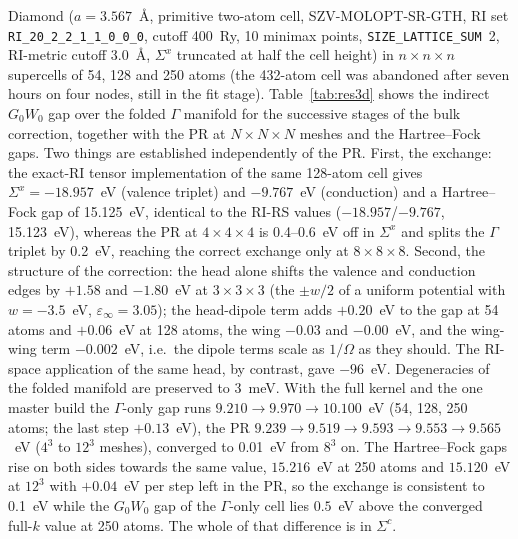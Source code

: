 \documentclass[%
 reprint,
superscriptaddress,
 amsmath,amssymb,
 aps,
prb,
]{revtex4-2}
\begin{document}
Diamond ($a=3.567$~\AA, primitive two-atom cell, SZV-MOLOPT-SR-GTH, RI set
\texttt{RI\_20\_2\_2\_1\_1\_0\_0\_0}, cutoff 400~Ry, 10 minimax points,
\texttt{SIZE\_LATTICE\_SUM}~2, RI-metric cutoff 3.0~\AA, $\Sigma^x$ truncated at half the
cell height) in $n\times n\times n$ supercells of 54, 128 and 250 atoms (the 432-atom cell was
abandoned after seven hours on four nodes, still in the fit stage). Table~\ref{tab:res3d} shows the
indirect $G_0W_0$ gap over the folded $\Gamma$ manifold for the successive stages of the
bulk correction, together with the PR at $N\times N\times N$ meshes and the Hartree--Fock
gaps. Two things are established independently of the PR. First, the exchange: the exact-RI
tensor implementation of the same 128-atom cell gives $\Sigma^x=-18.957$~eV (valence triplet)
and $-9.767$~eV (conduction) and a Hartree--Fock gap of 15.125~eV, identical to the RI-RS
values ($-18.957$/$-9.767$, 15.123~eV), whereas the PR at $4\times4\times4$ is 0.4--0.6~eV off
in $\Sigma^x$ and splits the $\Gamma$ triplet by 0.2~eV, reaching the correct exchange only at
$8\times8\times8$. Second, the structure of the correction: the head alone shifts the valence
and conduction edges by $+1.58$ and $-1.80$~eV at $3\times3\times3$ (the $\pm w/2$ of a uniform
potential with $w=-3.5$~eV, $\varepsilon_\infty=3.05$); the head-dipole term adds $+0.20$~eV
to the gap at 54 atoms and $+0.06$~eV at 128 atoms, the wing $-0.03$ and $-0.00$~eV, and the
wing-wing term $-0.002$~eV, i.e.\ the dipole terms scale as $1/\Omega$ as they should. The
RI-space application of the same head, by contrast, gave $-96$~eV. Degeneracies of the folded
manifold are preserved to 3~meV. With the full kernel and the one master build the
$\Gamma$-only gap runs $9.210\to9.970\to10.100$~eV (54, 128, 250 atoms; the last step
$+0.13$~eV), the PR $9.239\to9.519\to9.593\to9.553\to9.565$~eV ($4^3$ to $12^3$ meshes),
converged to 0.01~eV from $8^3$ on. The Hartree--Fock gaps rise on both sides towards the same
value, $15.216$~eV at 250 atoms and $15.120$~eV at $12^3$ with $+0.04$~eV per step left in the
PR, so the exchange is consistent to 0.1~eV while the $G_0W_0$ gap of the $\Gamma$-only cell
lies $0.5$~eV above the converged full-$k$ value at 250 atoms. The whole of that difference is
in $\Sigma^c$.
\end{document}

